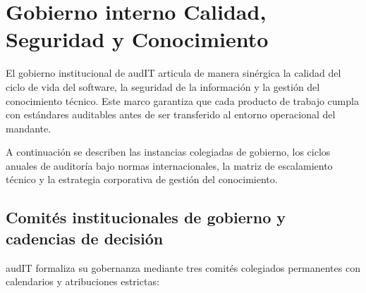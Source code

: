 \section{Gobierno interno Calidad, Seguridad y Conocimiento}\label{sec:1-gobierno}

El gobierno institucional de audIT articula de manera sinérgica la calidad del ciclo de vida del software, la seguridad de la información y la gestión del conocimiento técnico. Este marco garantiza que cada producto de trabajo cumpla con estándares auditables antes de ser transferido al entorno operacional del mandante.

A continuación se describen las instancias colegiadas de gobierno, los ciclos anuales de auditoría bajo normas internacionales, la matriz de escalamiento técnico y la estrategia corporativa de gestión del conocimiento.

\subsection{Comités institucionales de gobierno y cadencias de decisión}\label{sec:1-comites}

audIT formaliza su gobernanza mediante tres comités colegiados permanentes con calendarios y atribuciones estrictas:

